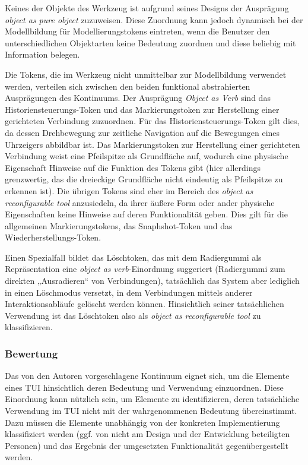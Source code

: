 Keines der Objekte des Werkzeug ist aufgrund seines Designs der Ausprägung \emph{object as pure object} zuzuweisen. Diese Zuordnung kann jedoch dynamisch bei der Modellbildung für Modellierungstokens eintreten, wenn die Benutzer den unterschiedlichen Objektarten keine Bedeutung zuordnen und diese beliebig mit Information belegen. 

Die Tokens, die im Werkzeug nicht unmittelbar zur Modellbildung verwendet werden, verteilen sich zwischen den beiden funktional abstrahierten Ausprägungen des Kontinuums. Der Ausprägung \emph{Object as Verb} sind das Historiensteuerungs-Token und das Markierungstoken zur Herstellung einer gerichteten Verbindung zuzuordnen. Für das Historiensteuerungs-Token gilt dies, da dessen Drehbewegung zur zeitliche Navigation auf die Bewegungen eines Uhrzeigers abbildbar ist. Das Markierungstoken zur Herstellung einer gerichteten Verbindung weist eine Pfeilspitze als Grundfläche auf, wodurch eine physische Eigenschaft Hinweise auf die Funktion des Tokens gibt (hier allerdings grenzwertig, das die dreieckige Grundfläche nicht eindeutig als Pfeilspitze zu erkennen ist). Die übrigen Tokens sind eher im Bereich des \emph{object as reconfigurable tool} anzusiedeln, da ihrer äußere Form oder ander physische Eigenschaften keine Hinweise auf deren Funktionalität geben. Dies gilt für die allgemeinen Markierungstokens, das Snaphshot-Token und das Wieder\-herstellungs-Token. 

Einen Spezialfall bildet das Löschtoken, das mit dem Radiergummi als Repräsentation eine \emph{object as verb}-Einordnung suggeriert (Radiergummi zum direkten „Ausradieren“ von Verbindungen), tatsächlich das System aber lediglich in einen Löschmodus versetzt, in dem Verbindungen mittels anderer Interaktionsabläufe gelöscht werden können. Hinsichtlich seiner tatsächlichen Verwendung ist das Löschtoken also als \emph{object as reconfigurable tool} zu klassifizieren.

\subsubsection{Bewertung} 

Das von den Autoren vorgeschlagene Kontinuum eignet sich, um die Elemente eines \gls{TUI} hinsichtlich deren Bedeutung und Verwendung einzuordnen. Diese Einordnung kann nützlich sein, um Elemente zu identifizieren, deren tatsächliche Verwendung im TUI nicht mit der wahrgenommenen Bedeutung übereinstimmt. Dazu müssen die Elemente unabhängig von der konkreten Implementierung klassifiziert werden (ggf. von nicht am Design und der Entwicklung beteiligten Personen) und das Ergebnis der umgesetzten Funktionalität gegenübergestellt werden.

